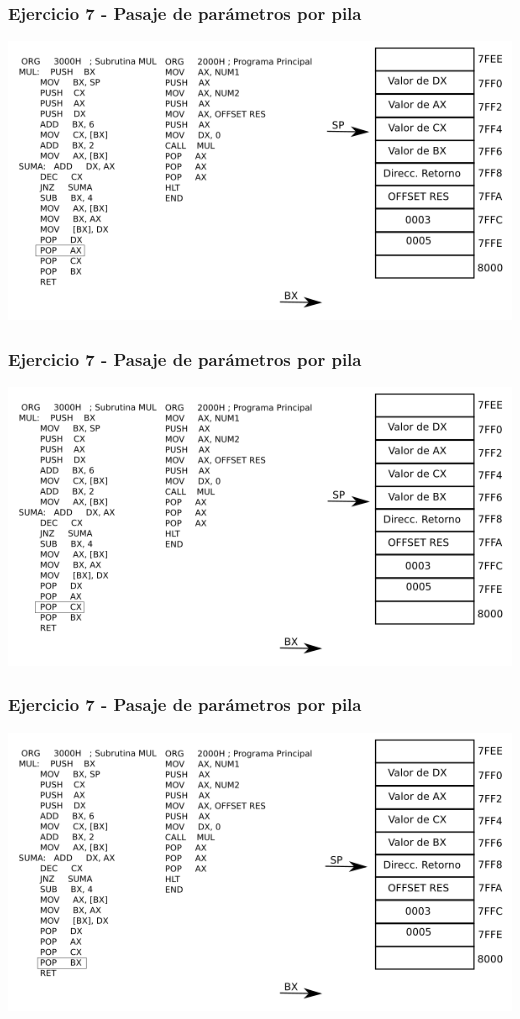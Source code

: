 \documentclass{beamer}
\begin{document}
\begin{frame}
\frametitle{Ejercicio 7 - Pasaje de parámetros por pila}
\includegraphics[scale=0.70]{imgs/imagen_015.png}
\end{frame}

\begin{frame}
\frametitle{Ejercicio 7 - Pasaje de parámetros por pila}
\includegraphics[scale=0.70]{imgs/imagen_016.png}
\end{frame}

\begin{frame}
\frametitle{Ejercicio 7 - Pasaje de parámetros por pila}
\includegraphics[scale=0.70]{imgs/imagen_017.png}
\end{frame}
\end{document}
